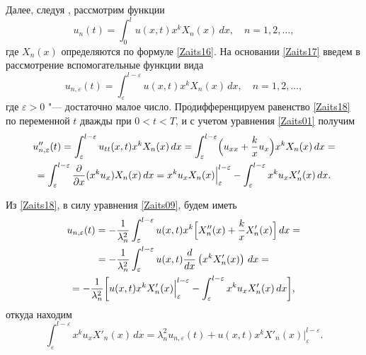 Далее, следуя \cite{Zaitseva:SKBVag,Zaitseva:Saf}, рассмотрим функции
\begin{equation}
\label{Zaits17}
u_n(t)= \int _0^l u(x,t)x^kX_n(x)\,dx,\quad n=1, 2, \ldots,
\end{equation}
где $X_n(x)$ определяются по формуле \eqref{Zaits16}. 
На основании \eqref{Zaits17} введем в рассмотрение вспомогательные функции вида
\begin{equation}
\label{Zaits18}
u_{n,\varepsilon}(t)= \int _\varepsilon^{l-\varepsilon} u(x,t)x^kX_n(x)\,dx,\quad n=1, 2, \ldots,
\end{equation}
где $\varepsilon>0$ "--- достаточно малое число.
Продифференцируем равенство \eqref{Zaits18} по переменной $t$ дважды при $0<t<T$, и с учетом уравнения \eqref{Zaits01} получим
\begin{multline}
\label{Zaits19}
u''_{n,\varepsilon}(t)= \int _\varepsilon^{l-\varepsilon} u_{tt}(x,t)x^kX_n(x)\,dx= \int _\varepsilon^{l-\varepsilon} \Bigl(u_{xx}+\frac{k}{x}u_x\Bigr)x^kX_n(x)\,dx=\\
= \int _\varepsilon^{l-\varepsilon}\frac{\partial}{\partial x}(x^ku_x)X_n(x)\,dx=x^ku_xX_n(x)\Bigr|_\varepsilon^{l-\varepsilon}- \int _\varepsilon^{l-\varepsilon} x^ku_xX'_n(x)\,dx.
\end{multline}

Из \eqref{Zaits18}, в силу уравнения \eqref{Zaits09}, будем иметь
\begin{multline*}
u_{n,\varepsilon}(t)=-\frac{1}{\lambda_n^2} \int _\varepsilon^{l-\varepsilon} u(x,t)x^k 
\Bigl[X''_n(x)+\frac{k}{x}X'_n(x)\Bigr]\,dx=\\
=-\frac{1}{\lambda_n^2} \int _\varepsilon^{l-\varepsilon} u(x,t)\frac{d}{dx}\left(x^kX'_n(x)\right)\,dx=\\
=-\frac{1}{\lambda_n^2}\biggl[u(x,t)x^kX'_n(x)\Bigr|_\varepsilon^{l-\varepsilon}- \int _\varepsilon^{l-\varepsilon}x^ku_xX'_n(x)\,dx\biggr],
\end{multline*}
откуда находим
\begin{equation}
\label{Zaits20}
 \int _\varepsilon^{l-\varepsilon}x^ku_xX'_n(x)\,dx=\lambda_n^2u_{n,\varepsilon}(t)+u(x,t)x^kX'_n(x)\Bigr|_\varepsilon^{l-\varepsilon}.
\end{equation}

